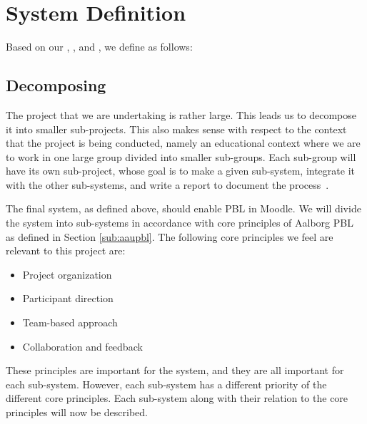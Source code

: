 \chapter{System Definition}
\label{sec:systemDef}
\label{chap:systemDef}
Based on our , , and , we define \system{} as follows:


\section{Decomposing \system}
\label{sub:decomposingSys}
The project that we are undertaking is rather large.
This leads us to decompose it into smaller sub-projects.
This also makes sense with respect to the context that the project is being conducted, namely an educational context where we are to work in one large group divided into smaller sub-groups. 
Each sub-group will have its own sub-project, whose goal is to make a given sub-system, integrate it with the other sub-systems, and write a report to document the process~\cite{sw6studieordning}.

The final system, as defined above, should enable PBL in Moodle.
We will divide the system into sub-systems in accordance with core principles of Aalborg PBL as defined in Section \ref{sub:aaupbl}.
The following core principles we feel are relevant to this project are:

\begin{itemize}
	\item Project organization
  \item Participant direction
  \item Team-based approach
  \item Collaboration and feedback
\end{itemize}

These principles are important for the system, and they are all important for each sub-system.
However, each sub-system has a different priority of the different core principles.
Each sub-system along with their relation to the core principles will now be described.


